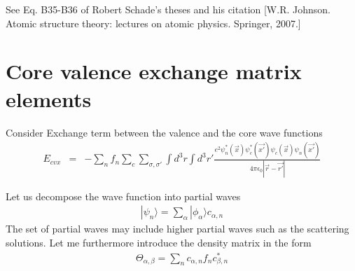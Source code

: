 \documentclass[11pt,a4paper]{report}
\begin{document}
See Eq. B35-B36 of Robert Schade's theses and his citation
[W.R. Johnson. Atomic structure theory: lectures on atomic
physics. Springer, 2007.]

\chapter{Core valence exchange matrix elements}




Consider Exchange term between the valence and the core wave functions
\begin{eqnarray}
E_{cvx}&=&-\sum_nf_n \sum_c 
\sum_{\sigma,\sigma'}\int d^3r\int d^3r'
\frac{e^2
\psi^*_n(\vec{x})\psi^*_c(\vec{x'})
\psi_c(\vec{x})\psi_n(\vec{x'})}{4\pi\epsilon_0|\vec{r}-\vec{r'}|}
\end{eqnarray}

Let us decompose the wave function into partial waves 
\begin{eqnarray}
|\psi_n\rangle=\sum_\alpha |\phi_\alpha\rangle c_{\alpha,n}
\end{eqnarray}
The set of partial waves may include higher partial waves such as the
scattering solutions. Let me furthermore  introduce the density
matrix in the form
\begin{eqnarray}
\Theta_{\alpha,\beta}=\sum_n c_{\alpha,n} f_n c^*_{\beta,n}
\end{eqnarray}
\end{document}
